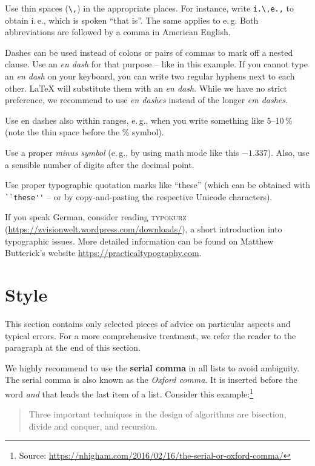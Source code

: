 Use thin spaces (\verb|\,|) in the appropriate places. For instance, write \verb|i.\,e.,| to obtain i.\,e., which is spoken ``that is''. The same applies to e.\,g. Both abbreviations are followed by a comma in American English.

Dashes can be used instead of colons or pairs of commas to mark off a nested clause. Use an \emph{en dash} for that purpose -- like in this example. If you cannot type an \emph{en dash} on your keyboard, you can write two regular hyphens next to each other. LaTeX will substitute them with an \emph{en dash}. While we have no strict preference, we recommend to use \emph{en dashes} instead of the longer \emph{em dashes}.

Use en dashes also within ranges, e.\,g., when you write something like 5--10\,\% (note the thin space before the \% symbol).

Use a proper \emph{minus symbol} (e.\,g., by using math mode like this \(-1.337\)). Also, use a sensible number of digits after the decimal point.

Use proper typographic quotation marks like ``these'' (which can be obtained with \verb|``these''| -- or by copy-and-pasting the respective Unicode characters).

If you speak German, consider reading \textsc{typokurz} (\url{https://zvisionwelt.wordpress.com/downloads/}), a short introduction into typographic issues. More detailed information can be found on Matthew Butterick's website \url{https://practicaltypography.com}.

\section{Style}

This section contains only selected pieces of advice on particular aspects and typical errors. For a more comprehensive treatment, we refer the reader to the paragraph  at the end of this section.

We highly recommend to use the \textbf{serial comma} in all lists to avoid ambiguity. The serial comma is also known as the \emph{Oxford comma}. It is inserted before the word \emph{and} that leads the last item of a list. Consider this example:\footnote{Source: \url{https://nhigham.com/2016/02/16/the-serial-or-oxford-comma/}}
\begin{quote}
  Three important techniques in the design of algorithms are bisection, divide and conquer, and recursion.
\end{quote}


